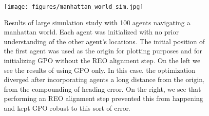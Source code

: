 \begin{figure}[H]
  \texttt{[image: figures/manhattan\_world\_sim.jpg]}
  \caption{Results of large simulation study with 100 agents navigating a manhattan world.  Each agent was initialized with no prior understanding of the other agent's locations.  The initial position of the first agent was used as the origin for plotting purposes and for initializing GPO without the REO alignment step.  On the left we see the results of using GPO only.  In this case, the optimization diverged after incorporating agents a long distance from the origin, from the compounding of heading error.  On the right, we see that performing an REO alignment step prevented this from happening and kept GPO robust to this sort of error.}
  \label{fig:manhattan_world_results}
\end{figure}
